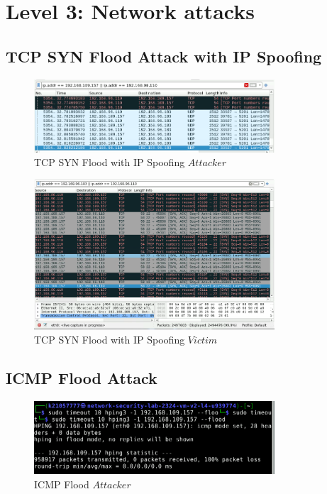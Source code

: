 \chapter{Level 3: Network attacks}

\section{TCP SYN Flood Attack with IP Spoofing}

\begin{figure}[H]
\centering
\includegraphics[width=0.8\textwidth]{img/level3/level3-attacker-TCPSYNFlood-pov.png}
\caption{TCP SYN Flood with IP Spoofing \(Attacker\)}\label{fig:TCPSYNFloodAttackerPOV}
\end{figure}

\begin{figure}[H]
\centering
\includegraphics[width=0.8\textwidth]{img/level3/level3-victim1-TCPSYNFlood-pov.png}
\caption{TCP SYN Flood with IP Spoofing \(Victim\)}\label{fig:TCPSYNFloodVictimPOV}
\end{figure}

\section{ICMP Flood Attack}

\begin{figure}[H]
\centering
\includegraphics[width=0.8\textwidth]{img/level3/level3-attacker-ICMPFlood-pov.png}
\caption{ICMP Flood \(Attacker\)}\label{fig:ICMPFloodAttackerPOV}
\end{figure}


